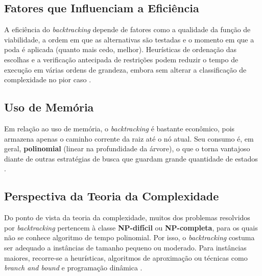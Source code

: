 \subsection{Fatores que Influenciam a Eficiência}

A eficiência do \textit{backtracking} depende de fatores como a qualidade da função de viabilidade, a ordem em que as alternativas são testadas e o momento em que a poda é aplicada (quanto mais cedo, melhor). Heurísticas de ordenação das escolhas e a verificação antecipada de restrições podem reduzir o tempo de execução em várias ordens de grandeza, embora sem alterar a classificação de complexidade no pior caso \cite{russell2013, levitin2011}.

\subsection{Uso de Memória}

Em relação ao uso de memória, o \textit{backtracking} é bastante econômico, pois armazena apenas o caminho corrente da raiz até o nó atual. Seu consumo é, em geral, \textbf{polinomial} (linear na profundidade da árvore), o que o torna vantajoso diante de outras estratégias de busca que guardam grande quantidade de estados \cite{russell2013}.

\subsection{Perspectiva da Teoria da Complexidade}

Do ponto de vista da teoria da complexidade, muitos dos problemas resolvidos por \textit{backtracking} pertencem à classe \textbf{NP-difícil} ou \textbf{NP-completa}, para os quais não se conhece algoritmo de tempo polinomial. Por isso, o \textit{backtracking} costuma ser adequado a instâncias de tamanho pequeno ou moderado. Para instâncias maiores, recorre-se a heurísticas, algoritmos de aproximação ou técnicas como \textit{branch and bound} e programação dinâmica \cite{kleinberg2008, toscani2012}.